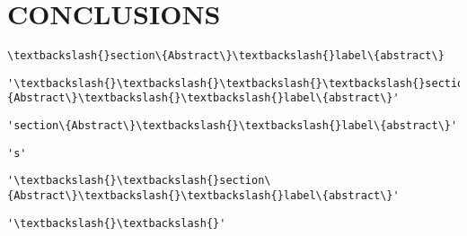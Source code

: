 \section*{CONCLUSIONS}\label{conclusions}
\begin{Verbatim}[commandchars=\\\{\}]
\textbackslash{}section\{Abstract\}\textbackslash{}label\{abstract\}
\end{Verbatim}
\begin{tcolorbox}[breakable, size=fbox, boxrule=.5pt, pad at break*=1mm, opacityfill=0]
\begin{Verbatim}[commandchars=\\\{\}]
'\textbackslash{}\textbackslash{}\textbackslash{}\textbackslash{}section\{Abstract\}\textbackslash{}\textbackslash{}label\{abstract\}'
\end{Verbatim}
\end{tcolorbox}
\begin{tcolorbox}[breakable, size=fbox, boxrule=.5pt, pad at break*=1mm, opacityfill=0]
\begin{Verbatim}[commandchars=\\\{\}]
'section\{Abstract\}\textbackslash{}\textbackslash{}label\{abstract\}'
\end{Verbatim}
\end{tcolorbox}
\begin{tcolorbox}[breakable, size=fbox, boxrule=.5pt, pad at break*=1mm, opacityfill=0]
\begin{Verbatim}[commandchars=\\\{\}]
's'
\end{Verbatim}
\end{tcolorbox}
\begin{tcolorbox}[breakable, size=fbox, boxrule=.5pt, pad at break*=1mm, opacityfill=0]
\begin{Verbatim}[commandchars=\\\{\}]
'\textbackslash{}\textbackslash{}section\{Abstract\}\textbackslash{}\textbackslash{}label\{abstract\}'
\end{Verbatim}
\end{tcolorbox}
\begin{tcolorbox}[breakable, size=fbox, boxrule=.5pt, pad at break*=1mm, opacityfill=0]
\begin{Verbatim}[commandchars=\\\{\}]
'\textbackslash{}\textbackslash{}'
\end{Verbatim}
\end{tcolorbox}
